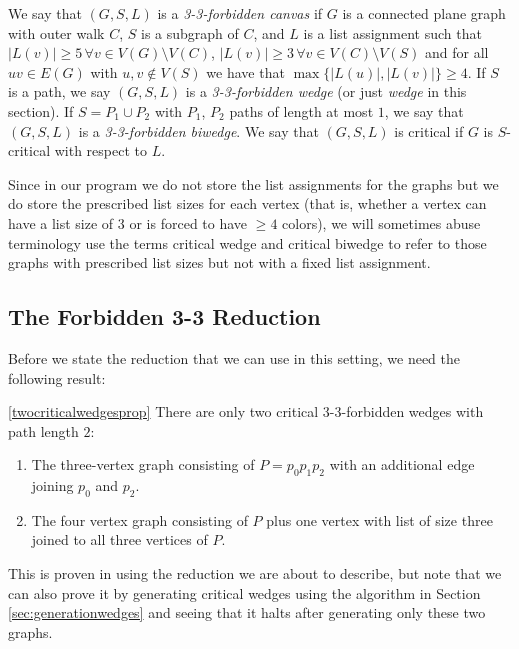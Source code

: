 \begin{definition}
	We say that $(G, S, L)$ is a \emph{3-3-forbidden canvas} if $G$ is a connected plane graph
 with outer walk $C$, $S$ is a subgraph of $C$, and $L$ is a list assignment
  such that $|L(v)| \geq 5 \, \forall v \in V(G) \setminus V(C)$,
   $|L(v)| \geq 3 \, \forall v \in V(C) \setminus V(S)$ and for all $uv \in E(G)$ with 
   $u, v \not\in V(S)$ we have that $\max\{|L(u)|, |L(v)|\} \geq 4$. If $S$ is a path,
    we say $(G, S, L)$ is a \emph{3-3-forbidden wedge} (or just \emph{wedge} in this section). 
    If $S = P_1 \cup P_2$ with $P_1$, $P_2$ paths of length at most $1$, we say that $(G, S, L)$ is a
    \emph{3-3-forbidden biwedge}. We say that $(G, S, L)$ is critical if $G$ is $S$-critical
    with respect to $L$.
\end{definition}

Since in our program we do not store the list assignments for the graphs but we do store the 
prescribed list sizes for each vertex (that is, whether a vertex can have a list size of $3$ or
is forced to have $\geq 4$ colors), we will sometimes abuse terminology
 use the terms critical wedge and critical biwedge
to refer to those graphs with prescribed list sizes but not with a fixed list assignment.

\subsection{The Forbidden 3-3 Reduction}

Before we state the reduction that we can use in this setting, we need the following result:

\begin{proposition}
\ref{twocriticalwedgesprop}
There are only two critical 3-3-forbidden wedges with path length $2$:

\begin{enumerate}
	\item The three-vertex graph consisting of $P = p_0p_1p_2$ with an additional edge joining
	$p_0$ and $p_2$.
	\item The four vertex graph consisting of $P$ plus one vertex with list of size three joined
	to all three vertices of $P$.
\end{enumerate}

\end{proposition}

This is proven in \cite{crossingsfarapart} using the reduction we are about to describe,
but note that we can also prove it by generating critical wedges using the algorithm in 
Section \ref{sec:generationwedges} and seeing that it halts after generating only these two graphs.

